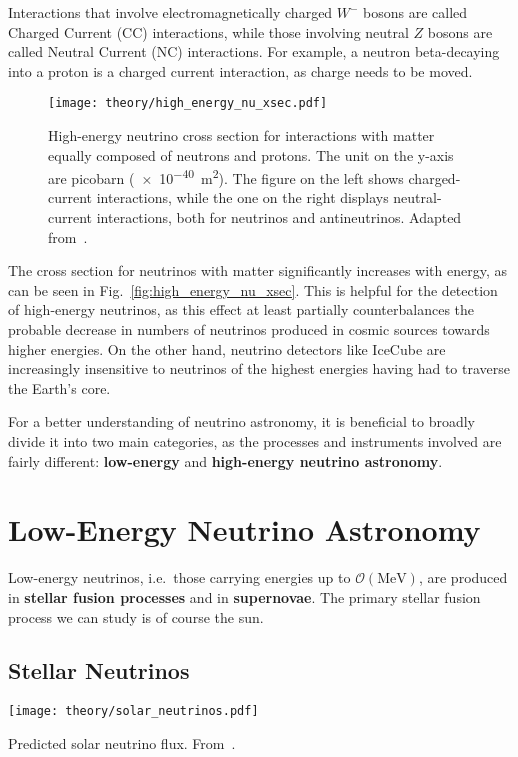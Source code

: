 Interactions that involve electromagnetically charged $W^-$ bosons are called Charged Current (CC) interactions, while those involving neutral $Z$ bosons are called Neutral Current (NC) interactions. For example, a neutron beta-decaying into a proton is a charged current interaction, as charge needs to be moved.

\begin{figure}[htb]
    \texttt{[image: theory/high\_energy\_nu\_xsec.pdf]}
    \caption[High-energy neutrino cross section]{High-energy neutrino cross section for interactions with matter equally composed of neutrons and protons. The unit on the y-axis are picobarn (\SI{e-40}{\m\squared}). The figure on the left shows charged-current interactions, while the one on the right displays neutral-current interactions, both for neutrinos and antineutrinos. Adapted from~\cite{CooperSarkar2011}.}
\end{figure}

The cross section for neutrinos with matter significantly increases with energy, as can be seen in Fig.~\ref{fig:high_energy_nu_xsec}. This is helpful for the detection of high-energy neutrinos, as this effect at least partially counterbalances the probable decrease in numbers of neutrinos produced in cosmic sources towards higher energies. On the other hand, neutrino detectors like IceCube are increasingly insensitive to neutrinos of the highest energies having had to traverse the Earth's core.

For a better understanding of neutrino astronomy, it is beneficial to broadly divide it into two main categories, as the processes and instruments involved are fairly different: \textbf{low-energy} and \textbf{high-energy neutrino astronomy}.

\section{Low-Energy Neutrino Astronomy}
Low-energy neutrinos, i.e.\ those carrying energies up to $\mathcal{O}(\unit{\mega\eV})$, are produced in \textbf{stellar fusion processes} and in \textbf{supernovae}. The primary stellar fusion process we can study is of course the sun.

\subsection{Stellar Neutrinos}
\begin{marginfigure}
    \texttt{[image: theory/solar\_neutrinos.pdf]}
    \caption[Predicted solar neutrino flux]{Predicted solar neutrino flux. From~\cite{Agostini2018}.}
\end{marginfigure}

